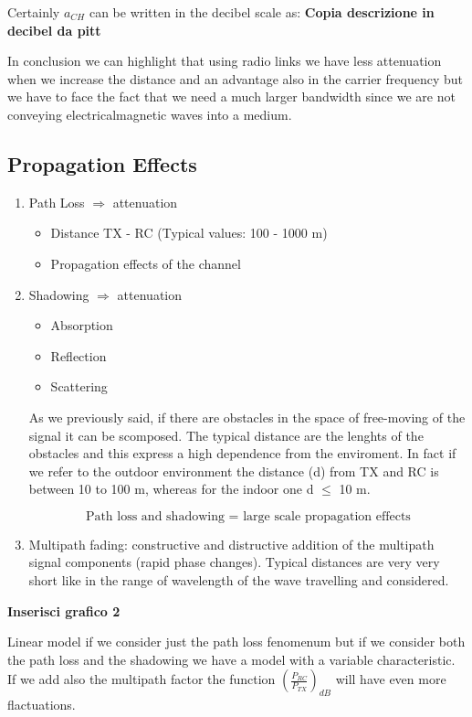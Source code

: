 Certainly $a_{CH}$ can be written in the decibel scale as:
\textbf{Copia descrizione in decibel da pitt}

In conclusion we can highlight that using radio links we have less attenuation when we increase the distance and an advantage also in the carrier frequency but we have to face the fact that we need a much larger bandwidth since we are not conveying electricalmagnetic waves into a medium.

\subsection{Propagation Effects }

\begin{enumerate}
\item Path Loss $\Rightarrow$ attenuation
\begin{itemize}
\item Distance TX - RC (Typical values: 100 - 1000 m)
\item Propagation effects of the channel
\end{itemize}
\item Shadowing $\Rightarrow$ attenuation
\begin{itemize}
\item Absorption
\item Reflection
\item Scattering
\end{itemize}

As we previously said, if there are obstacles in the space of free-moving of the signal it can be scomposed. The typical distance are the lenghts of the obstacles and this express a high dependence from the enviroment. In fact if we refer to the outdoor environment the distance (d) from TX and RC is between 10 to 100 m, whereas for the indoor one d $\leq$ 10 m.

$$\text{Path loss and shadowing = large scale propagation effects}$$
\item Multipath fading: constructive and distructive addition of the multipath signal components (rapid phase changes).
Typical distances are very very short like in the range of wavelength of the wave travelling and considered.
\end{enumerate}

\textbf{Inserisci grafico 2}

Linear model if we consider just the path loss fenomenum but if we consider both the path loss and the shadowing we have a model with a variable characteristic. If we add also the multipath factor the function $(\frac{P_{RC}}{P_{TX}})_{dB}$ will have even more flactuations.

